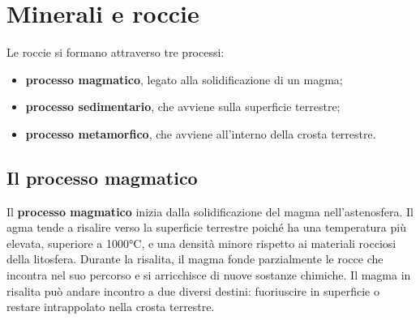 \documentclass[a4paper]{article}
\begin{document}
\pagebreak

\section{Minerali e roccie}



Le roccie si formano attraverso tre processi:
\begin{itemize}
    \item \textbf{processo magmatico}, legato alla solidificazione di un magma;
    \item \textbf{processo sedimentario}, che avviene sulla superficie terrestre;
    \item \textbf{processo metamorfico}, che avviene all'interno della crosta terrestre.
\end{itemize}

\subsection{Il processo magmatico}

Il \textbf{processo magmatico} inizia dalla solidificazione del magma
nell'astenosfera.
Il agma tende a risalire verso la superficie terrestre poiché ha una temperatura più elevata,
superiore a 1000°C, e una densità minore rispetto ai materiali rocciosi della litosfera.
Durante la risalita, il magma fonde parzialmente le rocce che incontra nel suo percorso e si
arricchisce di nuove sostanze chimiche.
Il magma in risalita può andare incontro a due diversi destini: fuoriuscire in superficie
o restare intrappolato nella crosta terrestre.



\end{document}
